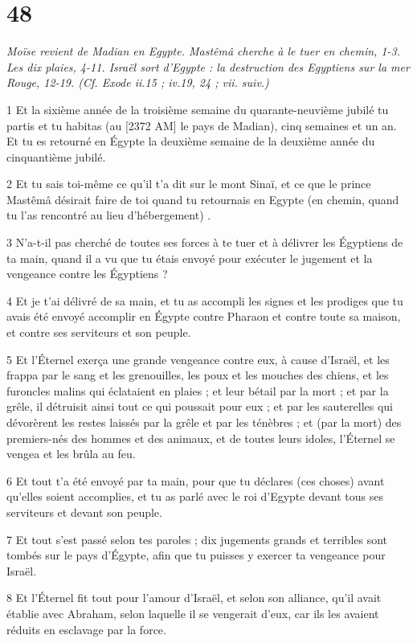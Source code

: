 \chapter{48}

\par \textit{Moïse revient de Madian en Egypte. Mastêmâ cherche à le tuer en chemin, 1-3. Les dix plaies, 4-11. Israël sort d'Egypte : la destruction des Egyptiens sur la mer Rouge, 12-19. (Cf. Exode ii.15 ; iv.19, 24 ; vii. suiv.)}

\par 1 Et la sixième année de la troisième semaine du quarante-neuvième jubilé tu partis et tu habitas (au [2372 AM] le pays de Madian), cinq semaines et un an. Et tu es retourné en Égypte la deuxième semaine de la deuxième année du cinquantième jubilé.
\par 2 Et tu sais toi-même ce qu'il t'a dit sur le mont Sinaï, et ce que le prince Mastêmâ désirait faire de toi quand tu retournais en Egypte (en chemin, quand tu l'as rencontré au lieu d'hébergement) .
\par 3 N'a-t-il pas cherché de toutes ses forces à te tuer et à délivrer les Égyptiens de ta main, quand il a vu que tu étais envoyé pour exécuter le jugement et la vengeance contre les Égyptiens ?
\par 4 Et je t'ai délivré de sa main, et tu as accompli les signes et les prodiges que tu avais été envoyé accomplir en Égypte contre Pharaon et contre toute sa maison, et contre ses serviteurs et son peuple.
\par 5 Et l'Éternel exerça une grande vengeance contre eux, à cause d'Israël, et les frappa par le sang et les grenouilles, les poux et les mouches des chiens, et les furoncles malins qui éclataient en plaies ; et leur bétail par la mort ; et par la grêle, il détruisit ainsi tout ce qui poussait pour eux ; et par les sauterelles qui dévorèrent les restes laissés par la grêle et par les ténèbres ; et (par la mort) des premiers-nés des hommes et des animaux, et de toutes leurs idoles, l'Éternel se vengea et les brûla au feu.
\par 6 Et tout t'a été envoyé par ta main, pour que tu déclares (ces choses) avant qu'elles soient accomplies, et tu as parlé avec le roi d'Egypte devant tous ses serviteurs et devant son peuple.
\par 7 Et tout s'est passé selon tes paroles ; dix jugements grands et terribles sont tombés sur le pays d'Égypte, afin que tu puisses y exercer ta vengeance pour Israël.
\par 8 Et l'Éternel fit tout pour l'amour d'Israël, et selon son alliance, qu'il avait établie avec Abraham, selon laquelle il se vengerait d'eux, car ils les avaient réduits en esclavage par la force.
